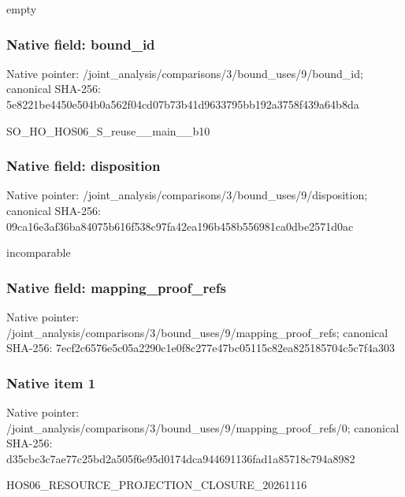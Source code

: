 \documentclass[10pt,a4paper]{article}
\begin{document}
\begingroup\raggedright\sloppy empty\par\endgroup

\subsubsection{Native field: bound\_\allowbreak{}id}
Native pointer: /joint\_\allowbreak{}analysis/comparisons/3/bound\_\allowbreak{}uses/9/bound\_\allowbreak{}id; canonical SHA-256: 5e8221be4450e504b0a562f04cd07b73b41d9633795bb192a3758f439a64b8da

\begingroup\raggedright\sloppy SO\_\allowbreak{}HO\_\allowbreak{}HOS06\_\allowbreak{}S\_\allowbreak{}reuse\_\allowbreak{}\_\allowbreak{}main\_\allowbreak{}\_\allowbreak{}b10\par\endgroup

\subsubsection{Native field: disposition}
Native pointer: /joint\_\allowbreak{}analysis/comparisons/3/bound\_\allowbreak{}uses/9/disposition; canonical SHA-256: 09ca16e3af36ba84075b616f538c97fa42ea196b458b556981ca0dbe2571d0ac

\begingroup\raggedright\sloppy incomparable\par\endgroup

\subsubsection{Native field: mapping\_\allowbreak{}proof\_\allowbreak{}refs}
Native pointer: /joint\_\allowbreak{}analysis/comparisons/3/bound\_\allowbreak{}uses/9/mapping\_\allowbreak{}proof\_\allowbreak{}refs; canonical SHA-256: 7ecf2c6576e5c05a2290c1e0f8c277e47bc05115c82ea825185704c5c7f4a303

\subsubsection{Native item 1}
Native pointer: /joint\_\allowbreak{}analysis/comparisons/3/bound\_\allowbreak{}uses/9/mapping\_\allowbreak{}proof\_\allowbreak{}refs/0; canonical SHA-256: d35cbc3c7ae77c25bd2a505f6e95d0174dca944691136fad1a85718c794a8982

\begingroup\raggedright\sloppy HOS06\_\allowbreak{}RESOURCE\_\allowbreak{}PROJECTION\_\allowbreak{}CLOSURE\_\allowbreak{}20261116\par\endgroup
\end{document}

